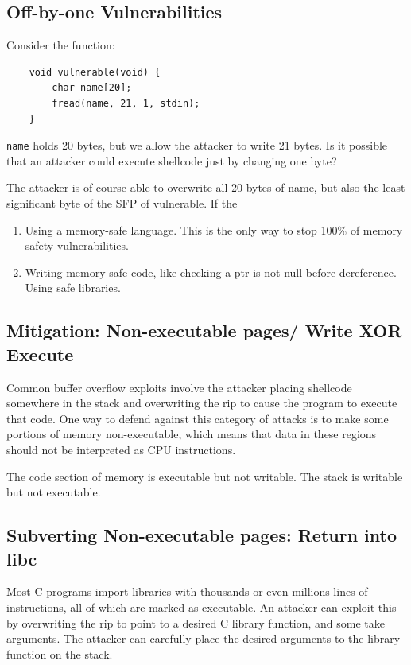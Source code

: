 \documentclass{article}
\begin{document}
\subsection{Off-by-one Vulnerabilities}
Consider the function:

\begin{lstlisting}
    void vulnerable(void) {
        char name[20];
        fread(name, 21, 1, stdin);
    }
\end{lstlisting}

\lstinline{name} holds 20 bytes, but we allow the attacker to write 21 bytes. Is it possible that an attacker could execute shellcode just by changing one byte?

The attacker is of course able to overwrite all 20 bytes of name, but also the least significant byte of the SFP of  vulnerable. If the

\begin{enumerate}
    \item Using a memory-safe language. This is the only way to stop 100\% of memory safety vulnerabilities.
    \item Writing memory-safe code, like checking a ptr is not null before dereference. Using safe libraries.
\end{enumerate}
\subsection{Mitigation: Non-executable pages/ Write XOR Execute}
Common buffer overflow exploits involve the attacker placing shellcode somewhere in the stack and overwriting the rip to cause the program to execute that code. One way to defend against this category of attacks is to make some portions of memory non-executable, which means that data in these regions should not be interpreted as CPU instructions.

The code section of memory is executable but not writable. The stack is writable but not executable.

\subsection{Subverting Non-executable pages: Return into libc}
Most C programs import libraries with thousands or even millions lines of instructions, all of which are marked as executable. An attacker can exploit this by overwriting the rip to point to a desired C library function, and some take arguments. The attacker can carefully place the desired arguments to the library function on the stack.
\end{document}

